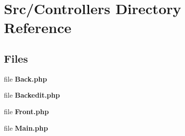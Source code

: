 \section{Src/\+Controllers Directory Reference}
\label{dir_56a6948c0b047eb485c43df86b07ff5e}
\subsection*{Files}
\begin{DoxyCompactItemize}
\item 
file \textbf{ Back.\+php}
\item 
file \textbf{ Backedit.\+php}
\item 
file \textbf{ Front.\+php}
\item 
file \textbf{ Main.\+php}
\end{DoxyCompactItemize}
